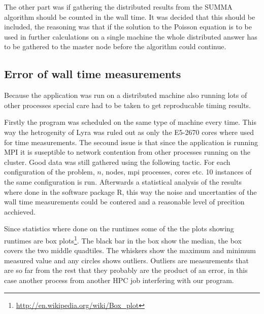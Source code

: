 \documentclass{article}
\begin{document}
The other part was if gathering the distributed results from the SUMMA algorithm
should be counted in the wall time. It was decided that this should be included,
the reasoning was that if the solution to the Poisson equation is to be used in
further calculations on a single machine the whole distributed answer has to be
gathered to the master node before the algorithm could continue.

\subsection{Error of wall time measurements}
Because the application was run on a distributed machine also running lots of
other processes special care had to be taken to get reproducable timing results.

Firstly the program was scheduled on the same type of machine every time. This
way the hetrogenity of Lyra was ruled out as only the E5-2670 cores where used
for time measurements. The secound issue is that since the application is running
MPI it is suseptible to network contention from other processes running on the
cluster. Good data was still gathered using the following tactic. For each configuration
of the problem, $n$, nodes, mpi processes, cores etc. 10 instances of the same
configuration is run. Afterwards a statistical analysis of the results where done
in the software package R\cite{r-project}, this way the noise and uncertanties of the
wall time measurements could be contered and a reasonable level of precition acchieved.

Since statistics where done on the runtimes some of the the plots showing runtimes 
are box plots\footnote{\url{http://en.wikipedia.org/wiki/Box_plot}}. The black bar
in the box show the median, the box covers the two middle quadtiles. The whiskers show the maximum
and minimum measured value and any circles shows outliers. Outliers are measurements
that are so far from the rest that they probably are the product of an error,
in this case another process from another HPC job interfering with our program.
\end{document}
